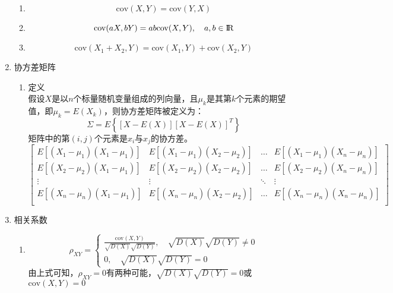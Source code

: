\begin{enumerate}
\begin{enumerate}
		\item 
		\begin{equation}
			\mathrm{cov}(X,Y) = \mathrm{cov}(Y,X)
		\end{equation}

		\item 
		\begin{equation}
			\mathrm{cov}(aX, bY) = ab\mathrm{cov}(X,Y), \quad a,b\in {\rm I\!R}
		\end{equation}

		\item 
		\begin{equation}
			\mathrm{cov}(X_1+X_2, Y) = \mathrm{cov}(X_1, Y) + \mathrm{cov}(X_2, Y)
		\end{equation}
	\end{enumerate}

	\item 协方差矩阵 \\
	\begin{enumerate}
		\item 定义 \\
		假设$X$是以$n$个标量随机变量组成的列向量，且$\mu_k$是其第$k$个元素的期望值，即$\mu_k=E(X_k)$，则协方差矩阵被定义为：
		\begin{equation}
			\Sigma = E\left\{\left[X-E(X)\right]\left[X-E(X)\right]^T\right\}
		\end{equation}
		矩阵中的第$(i,j)$个元素是$x_i$与$x_j$的协方差。
		\begin{equation}
		\left[\begin{matrix}
		E\left[(X_1-\mu_1)(X_1-\mu_1)\right] & E\left[(X_1-\mu_1)(X_2-\mu_2)\right] & \dots & E\left[(X_1-\mu_1)(X_n-\mu_n)\right] \\
		E\left[(X_2-\mu_2)(X_1-\mu_1)\right] & E\left[(X_2-\mu_2)(X_2-\mu_2)\right] & \dots & E\left[(X_2-\mu_2)(X_n-\mu_n)\right] \\
		\vdots & \vdots & \ddots & \vdots \\
		E\left[(X_n-\mu_n)(X_1-\mu_1)\right] & E\left[(X_n-\mu_n)(X_2-\mu_2)\right] & \dots & E\left[(X_n-\mu_n)(X_n-\mu_n)\right] \\
		\end{matrix}\right]
		\end{equation}
	\end{enumerate}
	
	
	\item 相关系数
	\begin{enumerate}
		\item 
		\[ \rho_{XY}=\begin{cases}
			\frac{\mathrm{cov}(X,Y)}{\sqrt{D(X)}\sqrt{D(Y)}}, \quad \sqrt{D(X)}\sqrt{D(Y)} \neq 0 \\
			0, \quad \sqrt{D(X)}\sqrt{D(Y)} = 0
		\end{cases} \]
		由上式可知，$\rho_{XY} = 0$有两种可能，$\sqrt{D(X)}\sqrt{D(Y)} = 0$或$\mathrm{cov}(X,Y)=0$


\end{enumerate}
\end{enumerate}
